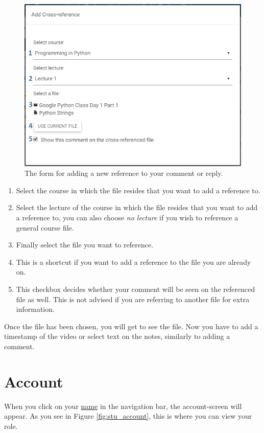\documentclass[a4paper,11pt]{report}
\begin{document}
\begin{figure}[H]
\centering
\includegraphics[scale=0.55]{imgs/stu_ref.png}
\caption{The form for adding a new reference to your comment or reply.}
\label{fig:stu_ref}
\end{figure}
\begin{enumerate}
\item Select the course in which the file resides that you want to add a reference to.
\item Select the lecture of the course in which the file resides that you want to add a reference to, you can also choose \textit{no lecture} if you wish to reference a general course file.
\item Finally select the file you want to reference.
\item This is a shortcut if you want to add a reference to the file you are already on.
\item This checkbox decides whether your comment will be seen on the referenced file as well. This is not advised if you are referring to another file for extra information.
\end{enumerate}

Once the file has been chosen, you will get to see the file. Now you have to add a timestamp of the video or select text on the notes, similarly to adding a comment.


\section{Account}
When you click on your \underline{name} in the navigation bar, the account-screen will appear. As you see in Figure \ref{fig:stu_account}, this is where you can view your role.
\end{document}
